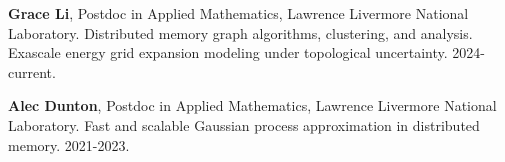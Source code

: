\begin{innerlist}

  \item[] \textbf{Grace Li},
  Postdoc in Applied Mathematics,
  Lawrence Livermore National Laboratory.
  Distributed memory graph algorithms, clustering, and analysis.
  Exascale energy grid expansion modeling under topological uncertainty.
  2024-current.

  \item[] \textbf{Alec Dunton},
  Postdoc in Applied Mathematics,
  Lawrence Livermore National Laboratory.
  Fast and scalable Gaussian process approximation in distributed memory.
  2021-2023.

\end{innerlist}
